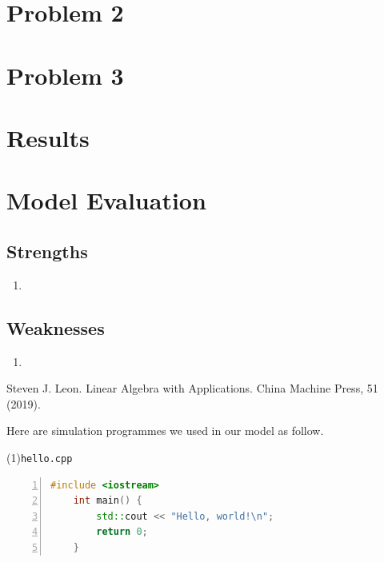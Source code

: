 \documentclass[UTF8]{mcmthesis}
\begin{document}
    \section{Problem 2}
    \section{Problem 3}
    \section{Results}
    \section{Model Evaluation}
        \subsection{Strengths}
            \begin{enumerate}
                \item 
            \end{enumerate}
            
        \subsection{Weaknesses}
            \begin{enumerate}
                \item 
            \end{enumerate}


        \begin{thebibliography}{99}
            Steven J. Leon.
            Linear Algebra with Applications.
            China Machine Press, 51 (2019).
        \end{thebibliography}


    \begin{appendices}
        Here are simulation programmes we used in our model as follow.
        
        \vspace{.5em}
        \noindent(1)\quad \verb|hello.cpp|
        \vspace{.5em}
        \begin{lstlisting}[language = c++, numbers = left]
    #include <iostream>
    int main() {
        std::cout << "Hello, world!\n";
        return 0;
    }
        \end{lstlisting}

    \end{appendices}
\end{document}
